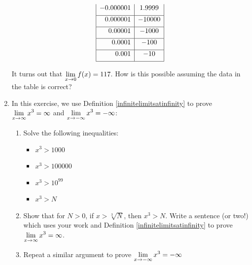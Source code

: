 \begin{enumerate}
\[\begin{array}{|r|c|}
-0.000001 & 1.9999 \\ [1ex]  \hline

0.000001 & -10000\\  [1ex]   \hline

0.00001 & -1000 \\ [1ex]  \hline

0.0001 & - 100 \\  [1ex] \hline

0.001 & -10 \\ [1ex]  \hline


\end{array} \]

It turns out that $\displaystyle{\lim_{x \rightarrow 0} f(x) = 117}$.  How is this possible assuming the data in the table is correct?

\item  In this exercise, we use Definition \ref{infinitelimitsatinfinity} to prove $\displaystyle{\lim_{x \rightarrow \infty} x^3 = \infty}$ and $\displaystyle{\lim_{x \rightarrow -\infty} x^3 = -\infty}$:


\begin{enumerate}

\item  Solve the following inequalities:

\begin{multicols}{4}

\begin{itemize}

\item  $x^3 > 1000$

\item  $x^3 > 100000$

\item  $x^3 > 10^{99}$

\item  $x^3 > N$

\end{itemize}

\end{multicols}

\item  Show that for $N > 0$, if $x > \sqrt[3]{N}$, then $x^3 > N$.  Write a sentence (or two!) which uses your work and Definition \ref{infinitelimitsatinfinity} to prove $\displaystyle{\lim_{x \rightarrow \infty} x^3 = \infty}$.

\item  Repeat a similar argument to prove $\displaystyle{\lim_{x \rightarrow -\infty} x^3 = -\infty}$

\end{enumerate}
 
\end{enumerate}

